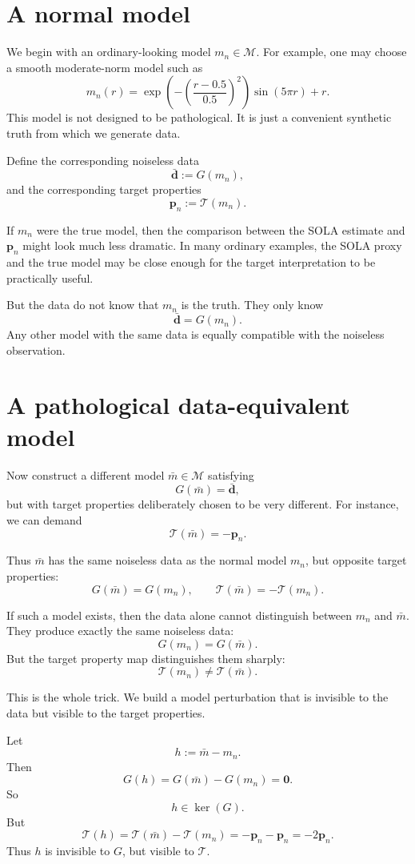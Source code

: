 \documentclass[11pt,openany]{book}
\theoremstyle{definition}
\theoremstyle{remark}
\newcommand{\M}{\mathcal M}
\newcommand{\Tau}{\mathcal{T}}
\newcommand{\kernel}{\operatorname{ker}}
\begin{document}
\section{A normal model}

We begin with an ordinary-looking model \(m_n\in\M\). For example, one may choose a smooth
moderate-norm model such as
\[
  m_n(r)
  =
  \exp\left(
    -\left(\frac{r-0.5}{0.5}\right)^2
  \right)
  \sin(5\pi r)+r.
\]
This model is not designed to be pathological. It is just a convenient synthetic truth from which
we generate data.

Define the corresponding noiseless data
\[
  \bar{\mathbf d}
  :=
  G(m_n),
\]
and the corresponding target properties
\[
  \mathbf p_n
  :=
  \Tau(m_n).
\]

If \(m_n\) were the true model, then the comparison between the SOLA estimate and
\(\mathbf p_n\) might look much less dramatic. In many ordinary examples, the SOLA proxy and
the true model may be close enough for the target interpretation to be practically useful.

But the data do not know that \(m_n\) is the truth. They only know
\[
  \bar{\mathbf d}=G(m_n).
\]
Any other model with the same data is equally compatible with the noiseless observation.

\section{A pathological data-equivalent model}

Now construct a different model \(\bar m\in\M\) satisfying
\[
  G(\bar m)=\bar{\mathbf d},
\]
but with target properties deliberately chosen to be very different. For instance, we can demand
\[
  \Tau(\bar m)=-\mathbf p_n.
\]

Thus \(\bar m\) has the same noiseless data as the normal model \(m_n\), but opposite target
properties:
\[
  G(\bar m)=G(m_n),
  \qquad
  \Tau(\bar m)=-\Tau(m_n).
\]

If such a model exists, then the data alone cannot distinguish between \(m_n\) and \(\bar m\).
They produce exactly the same noiseless data:
\[
  G(m_n)=G(\bar m).
\]
But the target property map distinguishes them sharply:
\[
  \Tau(m_n)\neq\Tau(\bar m).
\]

This is the whole trick. We build a model perturbation that is invisible to the data but visible to
the target properties.

Let
\[
  h:=\bar m-m_n.
\]
Then
\[
  G(h)=G(\bar m)-G(m_n)=\mathbf 0.
\]
So
\[
  h\in\kernel(G).
\]
But
\[
  \Tau(h)=\Tau(\bar m)-\Tau(m_n)
  =
  -\mathbf p_n-\mathbf p_n
  =
  -2\mathbf p_n.
\]
Thus \(h\) is invisible to \(G\), but visible to \(\Tau\).
\end{document}
